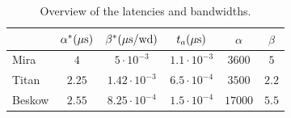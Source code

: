 \documentclass{sig-alternate}
\begin{document}
\begin{table}
\centering
\caption{Overview of the latencies and bandwidths.}
\begin{tabular}{l|ccccc} 
\hline
 & $\alpha^* (\unit[]{\mu s})$ & $\beta^* (\unit[]{\mu s/wd})$ & $t_a (\unit[]{\mu s})$ & $\alpha$ & $\beta$ \\
 \hline
 Mira   &  $4$   & $5\cdot 10^{-3}$                     & $1.1 \cdot 10^{-3}$ & $3600$ & $5$   \\ 
Titan  & $2.25$ & $1.42\cdot 10^{-3}$ & $6.5 \cdot 10^{-4}$ & $3500$ & $2.2$ \\ %
Beskow & $2.55$ & $8.25\cdot 10^{-4}$ & $1.5 \cdot 10^{-4}$ &$17000$ & $5.5$ \\ %
\hline
\end{tabular}
\label{tab:alpha_beta}
\end{table}
\end{document}
